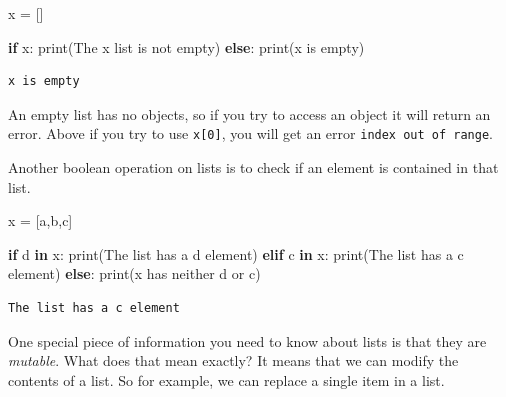 \documentclass[
  letterpaper,
]{scrbook}
\newenvironment{Shaded}{\begin{snugshade}}{\end{snugshade}}
\newcommand{\BuiltInTok}[1]{\textcolor[rgb]{0.00,0.23,0.31}{#1}}
\newcommand{\ControlFlowTok}[1]{\textcolor[rgb]{0.00,0.23,0.31}{\textbf{#1}}}
\newcommand{\KeywordTok}[1]{\textcolor[rgb]{0.00,0.23,0.31}{\textbf{#1}}}
\newcommand{\NormalTok}[1]{\textcolor[rgb]{0.00,0.23,0.31}{#1}}
\newcommand{\OperatorTok}[1]{\textcolor[rgb]{0.37,0.37,0.37}{#1}}
\newcommand{\StringTok}[1]{\textcolor[rgb]{0.13,0.47,0.30}{#1}}
\begin{document}
\begin{Shaded}
\begin{Highlighting}[]
\NormalTok{x }\OperatorTok{=}\NormalTok{ []}

\ControlFlowTok{if}\NormalTok{ x:}
  \BuiltInTok{print}\NormalTok{(}\StringTok{\textquotesingle{}The x list is not empty\textquotesingle{}}\NormalTok{)}
\ControlFlowTok{else}\NormalTok{:}
  \BuiltInTok{print}\NormalTok{(}\StringTok{\textquotesingle{}x is empty\textquotesingle{}}\NormalTok{)}
\end{Highlighting}
\end{Shaded}

\begin{verbatim}
x is empty
\end{verbatim}

An empty list has no objects, so if you try to access an object it will
return an error. Above if you try to use \texttt{x{[}0{]}}, you will get
an error \texttt{index\ out\ of\ range}.

Another boolean operation on lists is to check if an element is
contained in that list.

\begin{Shaded}
\begin{Highlighting}[]
\NormalTok{x }\OperatorTok{=}\NormalTok{ [}\StringTok{\textquotesingle{}a\textquotesingle{}}\NormalTok{,}\StringTok{\textquotesingle{}b\textquotesingle{}}\NormalTok{,}\StringTok{\textquotesingle{}c\textquotesingle{}}\NormalTok{]}

\ControlFlowTok{if} \StringTok{\textquotesingle{}d\textquotesingle{}} \KeywordTok{in}\NormalTok{ x:}
  \BuiltInTok{print}\NormalTok{(}\StringTok{\textquotesingle{}The list has a d element\textquotesingle{}}\NormalTok{)}
\ControlFlowTok{elif} \StringTok{\textquotesingle{}c\textquotesingle{}} \KeywordTok{in}\NormalTok{ x:}
  \BuiltInTok{print}\NormalTok{(}\StringTok{\textquotesingle{}The list has a c element\textquotesingle{}}\NormalTok{)}
\ControlFlowTok{else}\NormalTok{:}
  \BuiltInTok{print}\NormalTok{(}\StringTok{\textquotesingle{}x has neither d or c\textquotesingle{}}\NormalTok{)}
\end{Highlighting}
\end{Shaded}

\begin{verbatim}
The list has a c element
\end{verbatim}

One special piece of information you need to know about lists is that
they are \emph{mutable}. What does that mean exactly? It means that we
can modify the contents of a list. So for example, we can replace a
single item in a list.
\end{document}
